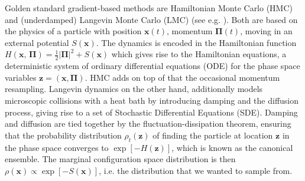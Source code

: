 \documentclass[tablecaption=bottom,wcp]{jmlr} %
\newcommand{\p}{\boldsymbol{\Pi}}
\newcommand{\x}{\boldsymbol{x}}
\newcommand{\Z}{\boldsymbol{z}}
\begin{document}
Golden standard gradient-based methods are Hamiltonian Monte Carlo (HMC) \citep{HMCDuane} and (underdamped) Langevin Monte Carlo (LMC) (see e.g. \citep{MolecularDynamics}). Both are based on the physics of a particle with position $\x(t)$, momentum $\p(t)$, moving in an external potential $S(\x)$.
The dynamics is encoded in the Hamiltonian function $H(\x, \, \p) = \frac{1}{2} \vert \p \vert^2 + S(\x)$ which gives rise to the Hamiltonian equations, a deterministic system of ordinary differential equations (ODE) for the phase space variables $\Z=(\x, \p)$. 
HMC adds on top of that the occasional momentum resampling. Langevin dynamics on the other hand, additionally models microscopic collisions with a heat bath by introducing damping and the diffusion process, giving rise to a set of Stochastic Differential Equations (SDE). Damping and diffusion are tied together by the fluctuation-dissipation theorem, ensuring that the probability distribution $\rho_{t}(\Z)$ of finding the particle at location $\Z$ in the phase space converges to $\exp[-H(\Z)]$, which is known as the canonical ensemble. The marginal configuration space distribution is then $\rho(\x) \propto \exp[- S(\x)]$, i.e. the distribution that we wanted to sample from.


\end{document}
